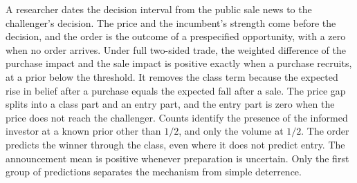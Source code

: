 \begin{chaptersummary}
A researcher dates the decision interval from the public sale news to the challenger's decision. The price and the incumbent's strength come before the decision, and the order is the outcome of a prespecified opportunity, with a zero when no order arrives. Under full two-sided trade, the weighted difference of the purchase impact and the sale impact is positive exactly when a purchase recruits, at a prior below the threshold. It removes the class term because the expected rise in belief after a purchase equals the expected fall after a sale. The price gap splits into a class part and an entry part, and the entry part is zero when the price does not reach the challenger. Counts identify the presence of the informed investor at a known prior other than \(1/2\), and only the volume at \(1/2\). The order predicts the winner through the class, even where it does not predict entry. The announcement mean is positive whenever preparation is uncertain. Only the first group of predictions separates the mechanism from simple deterrence.
\end{chaptersummary}

\answersection


